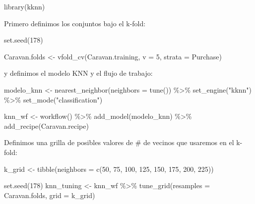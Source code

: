 \documentclass[
  12pt,
]{book}
\newenvironment{Shaded}{\begin{snugshade}}{\end{snugshade}}
\newcommand{\AttributeTok}[1]{\textcolor[rgb]{0.77,0.63,0.00}{#1}}
\newcommand{\DecValTok}[1]{\textcolor[rgb]{0.00,0.00,0.81}{#1}}
\newcommand{\FunctionTok}[1]{\textcolor[rgb]{0.00,0.00,0.00}{#1}}
\newcommand{\NormalTok}[1]{#1}
\newcommand{\OtherTok}[1]{\textcolor[rgb]{0.56,0.35,0.01}{#1}}
\newcommand{\SpecialCharTok}[1]{\textcolor[rgb]{0.00,0.00,0.00}{#1}}
\newcommand{\StringTok}[1]{\textcolor[rgb]{0.31,0.60,0.02}{#1}}
\begin{document}
\begin{Shaded}
\begin{Highlighting}[]
\FunctionTok{library}\NormalTok{(kknn)}
\end{Highlighting}
\end{Shaded}

Primero definimos los conjuntos bajo el k-fold:

\begin{Shaded}
\begin{Highlighting}[]
\FunctionTok{set.seed}\NormalTok{(}\DecValTok{178}\NormalTok{)}

\NormalTok{Caravan.folds }\OtherTok{\textless{}{-}} \FunctionTok{vfold\_cv}\NormalTok{(Caravan.training, }\AttributeTok{v =} \DecValTok{5}\NormalTok{,}
    \AttributeTok{strata =}\NormalTok{ Purchase)}
\end{Highlighting}
\end{Shaded}

y definimos el modelo KNN y el flujo de trabajo:

\begin{Shaded}
\begin{Highlighting}[]
\NormalTok{modelo\_knn }\OtherTok{\textless{}{-}} \FunctionTok{nearest\_neighbor}\NormalTok{(}\AttributeTok{neighbors =} \FunctionTok{tune}\NormalTok{()) }\SpecialCharTok{\%\textgreater{}\%}
    \FunctionTok{set\_engine}\NormalTok{(}\StringTok{"kknn"}\NormalTok{) }\SpecialCharTok{\%\textgreater{}\%}
    \FunctionTok{set\_mode}\NormalTok{(}\StringTok{"classification"}\NormalTok{)}

\NormalTok{knn\_wf }\OtherTok{\textless{}{-}} \FunctionTok{workflow}\NormalTok{() }\SpecialCharTok{\%\textgreater{}\%}
    \FunctionTok{add\_model}\NormalTok{(modelo\_knn) }\SpecialCharTok{\%\textgreater{}\%}
    \FunctionTok{add\_recipe}\NormalTok{(Caravan.recipe)}
\end{Highlighting}
\end{Shaded}

Definimos una grilla de posibles valores de \# de vecinos que usaremos
en el k-fold:

\begin{Shaded}
\begin{Highlighting}[]
\NormalTok{k\_grid }\OtherTok{\textless{}{-}} \FunctionTok{tibble}\NormalTok{(}\AttributeTok{neighbors =} \FunctionTok{c}\NormalTok{(}\DecValTok{50}\NormalTok{, }\DecValTok{75}\NormalTok{, }\DecValTok{100}\NormalTok{, }\DecValTok{125}\NormalTok{, }\DecValTok{150}\NormalTok{,}
    \DecValTok{175}\NormalTok{, }\DecValTok{200}\NormalTok{, }\DecValTok{225}\NormalTok{))}

\FunctionTok{set.seed}\NormalTok{(}\DecValTok{178}\NormalTok{)}
\NormalTok{knn\_tuning }\OtherTok{\textless{}{-}}\NormalTok{ knn\_wf }\SpecialCharTok{\%\textgreater{}\%}
    \FunctionTok{tune\_grid}\NormalTok{(}\AttributeTok{resamples =}\NormalTok{ Caravan.folds, }\AttributeTok{grid =}\NormalTok{ k\_grid)}
\end{Highlighting}
\end{Shaded}
\end{document}
